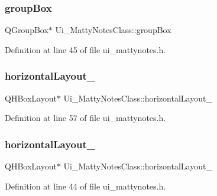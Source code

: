 \hypertarget{classUi__MattyNotesClass_a658cd965413e1623c38cda605681e4f7}{}\label{classUi__MattyNotesClass_a658cd965413e1623c38cda605681e4f7} 
\subsubsection{\texorpdfstring{group\+Box}{groupBox}}
{\footnotesize\ttfamily Q\+Group\+Box$\ast$ Ui\+\_\+\+Matty\+Notes\+Class\+::group\+Box}



Definition at line 45 of file ui\+\_\+mattynotes.\+h.

\hypertarget{classUi__MattyNotesClass_a6681d3ce8f04c81a339e747865079634}{}\label{classUi__MattyNotesClass_a6681d3ce8f04c81a339e747865079634} 
\subsubsection{\texorpdfstring{horizontal\+Layout\+\_}{horizontalLayout\_10}}
{\footnotesize\ttfamily Q\+H\+Box\+Layout$\ast$ Ui\+\_\+\+Matty\+Notes\+Class\+::horizontal\+Layout\+\_}



Definition at line 57 of file ui\+\_\+mattynotes.\+h.

\hypertarget{classUi__MattyNotesClass_a5c081a5789ce4ce85b7e3cbdeccb3184}{}\label{classUi__MattyNotesClass_a5c081a5789ce4ce85b7e3cbdeccb3184} 
\subsubsection{\texorpdfstring{horizontal\+Layout\+\_}{horizontalLayout\_7}}
{\footnotesize\ttfamily Q\+H\+Box\+Layout$\ast$ Ui\+\_\+\+Matty\+Notes\+Class\+::horizontal\+Layout\+\_}



Definition at line 44 of file ui\+\_\+mattynotes.\+h.


